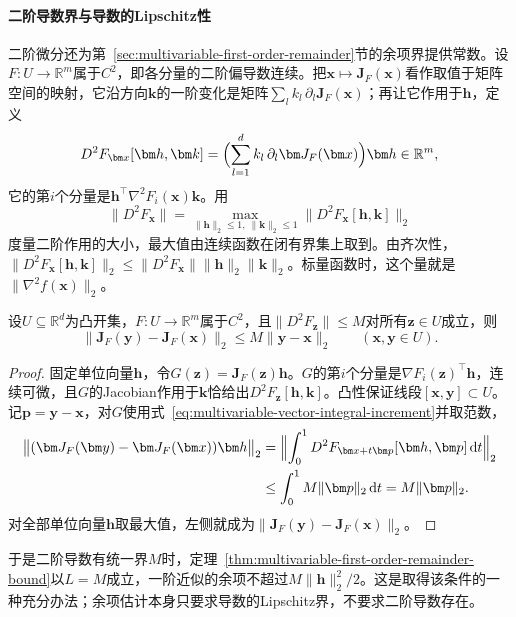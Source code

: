 \paragraph{二阶导数界与导数的Lipschitz性}
二阶微分还为第~\ref{sec:multivariable-first-order-remainder}节的余项界提供常数。设$F:U\to\mathbb R^m$属于$C^2$，即各分量的二阶偏导数连续。把$\bm x\mapsto\bm J_F(\bm x)$看作取值于矩阵空间的映射，它沿方向$\bm k$的一阶变化是矩阵$\sum_lk_l\,\partial_l\bm J_F(\bm x)$；再让它作用于$\bm h$，定义
\[
 D^2F_{\bm x}[\bm h,\bm k]=\Bigl(\sum_{l=1}^dk_l\,\partial_l\bm J_F(\bm x)\Bigr)\bm h\in\mathbb R^m ,
\]
它的第$i$个分量是$\bm h^\top\nabla^2F_i(\bm x)\bm k$。用
\[
 \lVert D^2F_{\bm x}\rVert=\max_{\lVert\bm h\rVert_2\leq1,\ \lVert\bm k\rVert_2\leq1}\lVert D^2F_{\bm x}[\bm h,\bm k]\rVert_2
\]
度量二阶作用的大小，最大值由连续函数在闭有界集上取到。由齐次性，$\lVert D^2F_{\bm x}[\bm h,\bm k]\rVert_2\leq\lVert D^2F_{\bm x}\rVert\lVert\bm h\rVert_2\lVert\bm k\rVert_2$。标量函数时，这个量就是$\lVert\nabla^2f(\bm x)\rVert_2$。
\begin{theorem}[二阶导数界给出导数的Lipschitz界]
\label{thm:multivariable-second-derivative-lipschitz}
设$U\subseteq\mathbb R^d$为凸开集，$F:U\to\mathbb R^m$属于$C^2$，且$\lVert D^2F_{\bm z}\rVert\leq M$对所有$\bm z\in U$成立，则
\[
 \lVert\bm J_F(\bm y)-\bm J_F(\bm x)\rVert_2\leq M\lVert\bm y-\bm x\rVert_2\qquad(\bm x,\bm y\in U).
\]
\end{theorem}
\begin{proof}
固定单位向量$\bm h$，令$G(\bm z)=\bm J_F(\bm z)\bm h$。$G$的第$i$个分量是$\nabla F_i(\bm z)^\top\bm h$，连续可微，且$G$的Jacobian作用于$\bm k$恰给出$D^2F_{\bm z}[\bm h,\bm k]$。凸性保证线段$[\bm x,\bm y]\subset U$。记$\bm p=\bm y-\bm x$，对$G$使用式~\eqref{eq:multivariable-vector-integral-increment}并取范数，
\[
 \begin{aligned}
 \bigl\lVert(\bm J_F(\bm y)-\bm J_F(\bm x))\bm h\bigr\rVert_2
 &=\Bigl\lVert\int_0^1D^2F_{\bm x+t\bm p}[\bm h,\bm p]\,\mathrm dt\Bigr\rVert_2\\
 &\leq\int_0^1M\lVert\bm p\rVert_2\,\mathrm dt=M\lVert\bm p\rVert_2 .
 \end{aligned}
\]
对全部单位向量$\bm h$取最大值，左侧就成为$\lVert\bm J_F(\bm y)-\bm J_F(\bm x)\rVert_2$。
\end{proof}
于是二阶导数有统一界$M$时，定理~\ref{thm:multivariable-first-order-remainder-bound}以$L=M$成立，一阶近似的余项不超过$M\lVert\bm h\rVert_2^2/2$。这是取得该条件的一种充分办法；余项估计本身只要求导数的Lipschitz界，不要求二阶导数存在。

